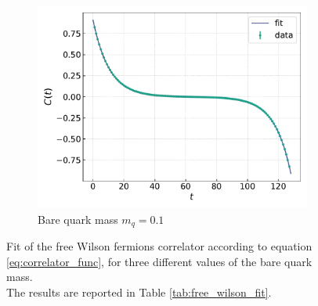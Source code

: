 \begin{figure}[h!]
    \begin{subfigure}[b]{0.68\textwidth}
        \includegraphics[width=\textwidth]{figures/correlator/corrs_free/corr_medium.pdf}
        \caption{Bare quark mass $m_q = 0.1$}        
    \end{subfigure}
    \caption[Fit of the correlator for free Wilson fermions.]{Fit of the free Wilson fermions correlator according to equation \eqref{eq:correlator_func}, for three different values of the bare quark mass. \\ The results are reported in  Table \ref{tab:free_wilson_fit}.}
    \label{fig:fit_wilson}
\end{figure}
\vfill
\newpage
